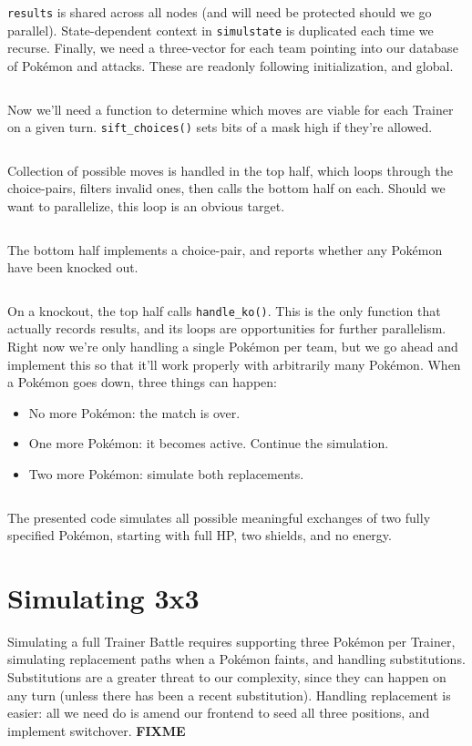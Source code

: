 \texttt{results} is shared across all nodes (and will need be protected should we go parallel).
State-dependent context in \texttt{simulstate} is duplicated each time we recurse.
Finally, we need a three-vector for each team pointing into our database of Pokémon and attacks.
These are readonly following initialization, and global.
\inputminted{cpp}{s/simul.h}
Now we'll need a function to determine which moves are viable for each Trainer on a given turn.
\texttt{sift\_choices()} sets bits of a mask high if they're allowed.
\inputminted{cpp}{s/sift.h}
Collection of possible moves is handled in the top half, which loops through the choice-pairs,
  filters invalid ones, then calls the bottom half on each.
Should we want to parallelize, this loop is an obvious target.
\inputminted{cpp}{s/top.h}
The bottom half implements a choice-pair, and reports whether
  any Pokémon have been knocked out.
\inputminted{cpp}{s/bottom.h}
On a knockout, the top half calls \texttt{handle\_ko()}.
This is the only function that actually records results, and its loops are opportunities for further parallelism.
Right now we're only handling a single Pokémon per team, but we
 go ahead and implement this so that it'll work properly
 with arbitrarily many Pokémon.
When a Pokémon goes down, three things can happen:
\begin{itemize}
  \item No more Pokémon: the match is over.
  \item One more Pokémon: it becomes active. Continue the simulation.
  \item Two more Pokémon: simulate both replacements.
\end{itemize}
\inputminted{cpp}{s/ko.h}
The presented code simulates all possible meaningful exchanges of two fully specified Pokémon, starting
  with full HP, two shields, and no energy.

\section{Simulating 3x3}
\label{sec:simul3x3}
Simulating a full Trainer Battle requires supporting three Pokémon per Trainer,
  simulating replacement paths when a Pokémon faints,
  and handling substitutions.
Substitutions are a greater threat to our complexity, since they can happen
  on any turn (unless there has been a recent substitution).
Handling replacement is easier: all we need do is amend our frontend to
  seed all three positions, and implement switchover.
\textbf{FIXME}
